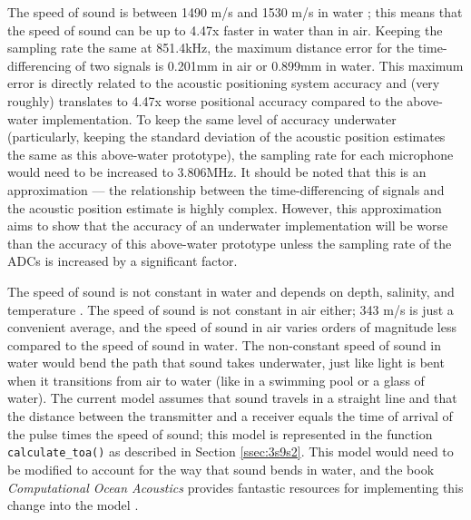 \documentclass[11pt]{ucthesisCP}
\begin{document}
The speed of sound is between 1490 m/s and 1530 m/s in water \cite{computational}; this means that the speed of sound can be up to 4.47x faster in water than in air. Keeping the sampling rate the same at 851.4kHz, the maximum distance error for the time-differencing of two signals is 0.201mm in air or 0.899mm in water. This maximum error is directly related to the acoustic positioning system accuracy and (very roughly) translates to 4.47x worse positional accuracy compared to the above-water implementation. To keep the same level of accuracy underwater (particularly, keeping the standard deviation of the acoustic position estimates the same as this above-water prototype), the sampling rate for each microphone would need to be increased to 3.806MHz. It should be noted that this is an approximation --- the relationship between the time-differencing of signals and the acoustic position estimate is highly complex. However, this approximation aims to show that the accuracy of an underwater implementation will be worse than the accuracy of this above-water prototype unless the sampling rate of the ADCs is increased by a significant factor.

The speed of sound is not constant in water and depends on depth, salinity, and temperature \cite{computational}. The speed of sound is not constant in air either; 343 m/s is just a convenient average, and the speed of sound in air varies orders of magnitude less compared to the speed of sound in water. The non-constant speed of sound in water would bend the path that sound takes underwater, just like light is bent when it transitions from air to water (like in a swimming pool or a glass of water). The current model assumes that sound travels in a straight line and that the distance between the transmitter and a receiver equals the time of arrival of the pulse times the speed of sound; this model is represented in the function \verb|calculate_toa()| as described in Section \ref{ssec:3s9s2}. This model would need to be modified to account for the way that sound bends in water, and the book \textit{Computational Ocean Acoustics} provides fantastic resources for implementing this change into the model \cite{computational}.
\end{document}

